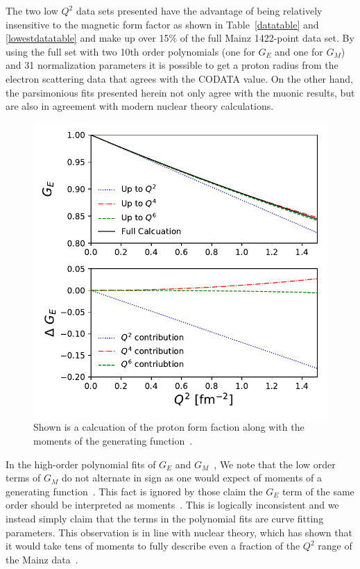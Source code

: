 \documentclass[10pt,superscriptaddress,aps,prc,twocolumn]{revtex4-1}
\begin{document}
The two low $Q^2$ data sets presented have the advantage of being relatively insensitive to the magnetic form 
factor as shown in Table~\ref{datatable} and \ref{lowestdatatable} and make up over
15\% of the full Mainz 1422-point data set.   By using the full set with two 10th order polynomials
(one for $G_E$ and one for $G_M$) and 31 normalization parameters it is possible to get a proton radius from the electron
scattering data that agrees with the 
CODATA value.     On the other hand,  the parsimonious fits presented herein not only agree with the muonic results, 
but are also in agreement with modern nuclear theory calculations.

\begin{figure}
\includegraphics[width=\columnwidth]{Figure/RealMoments.pdf}
\caption{Shown is a calcuation of the proton form faction along with the moments of the generating 
function~\cite{Alarcon:2017lhg}.}
\end{figure}

In the high-order polynomial fits of $G_E$ and $G_M$~\cite{Sick:2017aor,Sick:2018fzn},
We note that the low order terms of $G_M$ do not alternate in sign as one would expect
of moments of a generating function~\cite{Bernauer:2010zga}.
This fact is ignored by those claim the $G_E$ term of the same order should
be interpreted as moments~\cite{Sick:2017aor,Sick:2018fzn}.   This is logically inconsistent
and we instead simply claim that the terms in the polynomial fits are curve fitting parameters.
This observation is in line with nuclear theory, which has shown 
that it would take tens of moments to fully describe even a fraction of the $Q^2$ 
range of the Mainz data~\cite{Alarcon:2018irp}.
\end{document}
